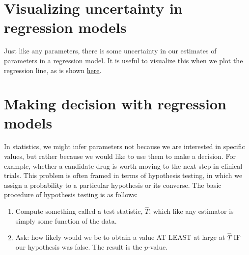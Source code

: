 \section{Visualizing uncertainty in regression models}

Just like any parameters, there is some uncertainty in our estimates of parameters in a regression model. It is useful to visualize this when we plot the regression line, as is shown \href{https://colab.research.google.com/drive/143hintE_kXYGkEIphvkUz5ngCdNu22F0#scrollTo=HRMu1e1vY7ZC&line=1&uniqifier=1}{here}.


\section{Making decision with regression models}
In statistics, we might infer parameters not because we are interested in specific values, but rather because we would like to use them to make a decision. For example, whether a candidate drug is worth moving to the next step in clinical trials. This problem is often framed in terms of {\dfn hypothesis testing}, in which we assign a probability to a particular hypothesis or its converse. The basic procedure of hypothesis testing is as follows:
\begin{enumerate}
\item Compute something called a test statistic, $\hat{T}$, which like any estimator is simply some function of the data. 
\item Ask: how likely would we be to obtain a value AT LEAST at large at $\hat{T}$ IF our hypothesis was false.  The result is the $p$-value. 
\end{enumerate}




